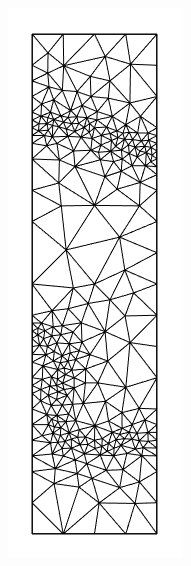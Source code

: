 \documentclass{article}
\begin{document}
\begin{figure}[H]
\begin{subfigure}[b]{0.1\linewidth}
    \caption{}
  \end{subfigure}
  \begin{subfigure}[b]{0.1\linewidth}
    \includegraphics[width=\linewidth]{Fig_submesh3.png}

\end{subfigure}
\end{figure}
\end{document}

